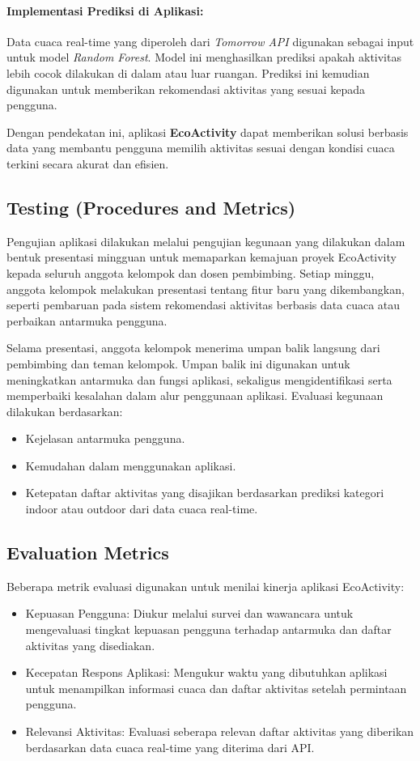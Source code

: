 \documentclass[journal,article,submit,pdftex,moreauthors]{Definitions/mdpi}
\begin{document}
\paragraph{Implementasi Prediksi di Aplikasi:}
Data cuaca real-time yang diperoleh dari \textit{Tomorrow API} digunakan sebagai input untuk model \textit{Random Forest}. Model ini menghasilkan prediksi apakah aktivitas lebih cocok dilakukan di dalam atau luar ruangan. Prediksi ini kemudian digunakan untuk memberikan rekomendasi aktivitas yang sesuai kepada pengguna.

Dengan pendekatan ini, aplikasi \textbf{EcoActivity} dapat memberikan solusi berbasis data yang membantu pengguna memilih aktivitas sesuai dengan kondisi cuaca terkini secara akurat dan efisien.

\subsection{Testing (Procedures and Metrics)}

Pengujian aplikasi dilakukan melalui pengujian kegunaan yang dilakukan dalam bentuk presentasi mingguan untuk memaparkan kemajuan proyek EcoActivity kepada seluruh anggota kelompok dan dosen pembimbing. Setiap minggu, anggota kelompok melakukan presentasi tentang fitur baru yang dikembangkan, seperti pembaruan pada sistem rekomendasi aktivitas berbasis data cuaca atau perbaikan antarmuka pengguna.

Selama presentasi, anggota kelompok menerima umpan balik langsung dari pembimbing dan teman kelompok. Umpan balik ini digunakan untuk meningkatkan antarmuka dan fungsi aplikasi, sekaligus mengidentifikasi serta memperbaiki kesalahan dalam alur penggunaan aplikasi. Evaluasi kegunaan dilakukan berdasarkan:

\begin{itemize}
    \item Kejelasan antarmuka pengguna.
    \item Kemudahan dalam menggunakan aplikasi.
    \item Ketepatan daftar aktivitas yang disajikan berdasarkan prediksi kategori indoor atau outdoor dari data cuaca real-time.
\end{itemize}
\subsection{Evaluation Metrics}
Beberapa metrik evaluasi digunakan untuk menilai kinerja aplikasi EcoActivity:  
\begin{itemize}
    \item Kepuasan Pengguna: Diukur melalui survei dan wawancara untuk mengevaluasi tingkat kepuasan pengguna terhadap antarmuka dan daftar aktivitas yang disediakan.  
    \item Kecepatan Respons Aplikasi: Mengukur waktu yang dibutuhkan aplikasi untuk menampilkan informasi cuaca dan daftar aktivitas setelah permintaan pengguna.  
    \item Relevansi Aktivitas: Evaluasi seberapa relevan daftar aktivitas yang diberikan berdasarkan data cuaca real-time yang diterima dari API.  
\end{itemize}
\end{document}
